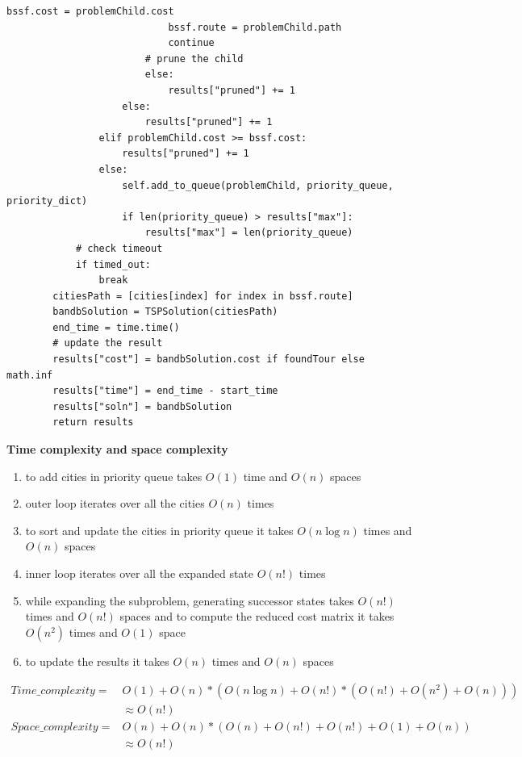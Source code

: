 \documentclass[12pt]{article}
\begin{document}
\begin{lstlisting}[style=mystyle]
                            bssf.cost = problemChild.cost
                            bssf.route = problemChild.path
                            continue
                        # prune the child
                        else:
                            results["pruned"] += 1
                    else:
                        results["pruned"] += 1
                elif problemChild.cost >= bssf.cost:
                    results["pruned"] += 1
                else:
                    self.add_to_queue(problemChild, priority_queue, priority_dict)
                    if len(priority_queue) > results["max"]:
                        results["max"] = len(priority_queue)
            # check timeout
            if timed_out:
                break
        citiesPath = [cities[index] for index in bssf.route]
        bandbSolution = TSPSolution(citiesPath)
        end_time = time.time()
        # update the result
        results["cost"] = bandbSolution.cost if foundTour else math.inf
        results["time"] = end_time - start_time
        results["soln"] = bandbSolution
        return results
    \end{lstlisting}
\newpage

\noindent\textbf{Time complexity and space complexity} 
\begin{enumerate}
    \item to add cities in priority queue takes $O(1)$ time and $O(n)$ spaces
    \item outer loop iterates over all the cities $O(n)$ times
    \item to sort and update the cities in priority queue it takes $O(n \log n)$ times and $O(n)$ spaces 
    \item inner loop iterates over all the expanded state $O(n!)$ times
    \item while expanding the subproblem, generating successor states takes $O(n!)$ times and $O(n!)$ 
    spaces and to compute the reduced cost matrix it takes $O(n^2)$ times and $O(1)$ space
    \item to update the results it takes $O(n)$ times and $O(n)$ spaces    
\end{enumerate}
\begin{equation} %
\begin{split}
    Time\_complexity =& O(1) + O(n) * (O(n \log n) + O(n!) * (O(n!) + O(n^2) + O(n))) \\ 
    &\approx O(n!) \\
    Space\_complexity =& O(n) + O(n) * (O(n) + O(n!) + O(n!) + O(1) + O(n)) \\
    &\approx O(n!)
\end{split}
\end{equation}
\end{document}
